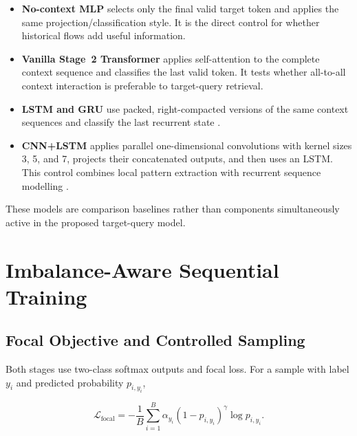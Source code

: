 \documentclass[11pt,fleqn]{report}
\begin{document}
\begin{itemize}[leftmargin=*]
    \item \textbf{No-context MLP} selects only the final valid target token and
    applies the same projection/classification style. It is the direct control
    for whether historical flows add useful information.

    \item \textbf{Vanilla Stage~2 Transformer} applies self-attention to the
    complete context sequence and classifies the last valid token. It tests
    whether all-to-all context interaction is preferable to target-query
    retrieval.

    \item \textbf{LSTM and GRU} use packed, right-compacted versions of the same
    context sequences and classify the last recurrent state
    \cite{Hochreiter1997LSTM,Cho2014GRU}.

    \item \textbf{CNN+LSTM} applies parallel one-dimensional convolutions with
    kernel sizes 3, 5, and 7, projects their concatenated outputs, and then uses
    an LSTM. This control combines local pattern extraction with recurrent
    sequence modelling \cite{Kim2014CNN,Hochreiter1997LSTM}.
\end{itemize}

These models are comparison baselines rather than components simultaneously
active in the proposed target-query model.

\section{Imbalance-Aware Sequential Training}
\label{subsec:method_training}

\subsection{Focal Objective and Controlled Sampling}
\label{subsubsec:focal_training}

Both stages use two-class softmax outputs and focal loss. For a sample with
label $y_i$ and predicted probability $p_{i,y_i}$,

\begin{equation}
    \mathcal{L}_{\mathrm{focal}}
    =-\frac{1}{B}
      \sum_{i=1}^{B}
      \alpha_{y_i}
      \left(1-p_{i,y_i}\right)^{\gamma}
      \log p_{i,y_i}.
    \label{eq:method_focal_loss}
\end{equation}
\end{document}

